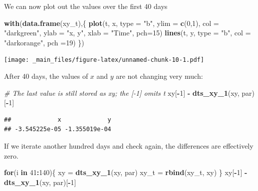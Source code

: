 \documentclass[
]{book}
\newenvironment{Shaded}{\begin{snugshade}}{\end{snugshade}}
\newcommand{\AttributeTok}[1]{\textcolor[rgb]{0.13,0.29,0.53}{#1}}
\newcommand{\CommentTok}[1]{\textcolor[rgb]{0.56,0.35,0.01}{\textit{#1}}}
\newcommand{\ControlFlowTok}[1]{\textcolor[rgb]{0.13,0.29,0.53}{\textbf{#1}}}
\newcommand{\DecValTok}[1]{\textcolor[rgb]{0.00,0.00,0.81}{#1}}
\newcommand{\FunctionTok}[1]{\textcolor[rgb]{0.13,0.29,0.53}{\textbf{#1}}}
\newcommand{\NormalTok}[1]{#1}
\newcommand{\OtherTok}[1]{\textcolor[rgb]{0.56,0.35,0.01}{#1}}
\newcommand{\SpecialCharTok}[1]{\textcolor[rgb]{0.81,0.36,0.00}{\textbf{#1}}}
\newcommand{\StringTok}[1]{\textcolor[rgb]{0.31,0.60,0.02}{#1}}
\begin{document}
We can now plot out the values over the first 40 days

\begin{Shaded}
\begin{Highlighting}[]
\FunctionTok{with}\NormalTok{(}\FunctionTok{data.frame}\NormalTok{(xy\_t),\{}
  \FunctionTok{plot}\NormalTok{(t, x, }\AttributeTok{type =} \StringTok{"b"}\NormalTok{, }\AttributeTok{ylim =} \FunctionTok{c}\NormalTok{(}\DecValTok{0}\NormalTok{,}\DecValTok{1}\NormalTok{), }\AttributeTok{col =} \StringTok{"darkgreen"}\NormalTok{, }\AttributeTok{ylab =} \StringTok{"x, y"}\NormalTok{, }\AttributeTok{xlab =} \StringTok{"Time"}\NormalTok{, }\AttributeTok{pch=}\DecValTok{15}\NormalTok{)}
  \FunctionTok{lines}\NormalTok{(t, y, }\AttributeTok{type =} \StringTok{"b"}\NormalTok{, }\AttributeTok{col =} \StringTok{"darkorange"}\NormalTok{, }\AttributeTok{pch =}\DecValTok{19}\NormalTok{)}
\NormalTok{\})}
\end{Highlighting}
\end{Shaded}

\texttt{[image: \_main\_files/figure-latex/unnamed-chunk-10-1.pdf]}

After 40 days, the values of \(x\) and \(y\) are not changing very much:

\begin{Shaded}
\begin{Highlighting}[]
\CommentTok{\# The last value is still stored as xy; the [{-}1] omits t}
\NormalTok{xy[}\SpecialCharTok{{-}}\DecValTok{1}\NormalTok{] }\SpecialCharTok{{-}} \FunctionTok{dts\_xy\_1}\NormalTok{(xy, par)[}\SpecialCharTok{{-}}\DecValTok{1}\NormalTok{]}
\end{Highlighting}
\end{Shaded}

\begin{verbatim}
##             x             y 
## -3.545225e-05 -1.355019e-04
\end{verbatim}

If we iterate another hundred days and check again, the differences are effectively zero.

\begin{Shaded}
\begin{Highlighting}[]
\ControlFlowTok{for}\NormalTok{(i }\ControlFlowTok{in} \DecValTok{41}\SpecialCharTok{:}\DecValTok{140}\NormalTok{)\{}
\NormalTok{  xy }\OtherTok{=} \FunctionTok{dts\_xy\_1}\NormalTok{(xy, par)}
\NormalTok{  xy\_t }\OtherTok{=} \FunctionTok{rbind}\NormalTok{(xy\_t, xy) }
\NormalTok{\} }
\NormalTok{xy[}\SpecialCharTok{{-}}\DecValTok{1}\NormalTok{] }\SpecialCharTok{{-}} \FunctionTok{dts\_xy\_1}\NormalTok{(xy, par)[}\SpecialCharTok{{-}}\DecValTok{1}\NormalTok{]}
\end{Highlighting}
\end{Shaded}
\end{document}
